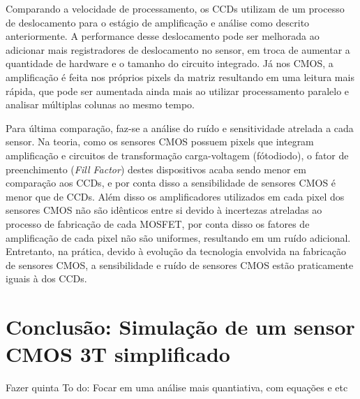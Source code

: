 \documentclass[10pt,a4paper,twocolumn]{article}
\begin{document}
	Comparando a velocidade de processamento, os CCDs utilizam de um processo de deslocamento para o estágio de amplificação e análise como descrito anteriormente. A performance desse deslocamento pode ser melhorada ao adicionar mais registradores de deslocamento no sensor, em troca de aumentar a quantidade de hardware e o tamanho do circuito integrado. Já nos CMOS, a amplificação é feita nos próprios pixels da matriz resultando em uma leitura mais rápida, que pode ser aumentada ainda mais ao utilizar processamento paralelo e analisar múltiplas colunas ao mesmo tempo.
	
	Para última comparação, faz-se a análise do ruído e sensitividade atrelada a cada sensor. Na teoria, como os sensores CMOS possuem pixels que integram amplificação e circuitos de transformação carga-voltagem (fótodiodo), o fator de preenchimento (\textit{Fill Factor}) destes dispositivos acaba sendo menor em comparação aos CCDs, e por conta disso a sensibilidade de sensores CMOS é menor que de CCDs. Além disso os amplificadores utilizados em cada pixel dos sensores CMOS não são idênticos entre si devido à incertezas atreladas ao processo de fabricação de cada MOSFET, por conta disso os fatores de amplificação de cada pixel não são uniformes, resultando em um ruído adicional. Entretanto, na prática, devido à evolução da tecnologia envolvida na fabricação de sensores CMOS, a sensibilidade e ruído de sensores CMOS estão praticamente iguais à dos CCDs.
	

	\section*{Conclusão: Simulação de um sensor CMOS 3T simplificado}
	Fazer quinta	
	To do: Focar em uma análise mais quantiativa, com equações e etc
	
\end{document}
